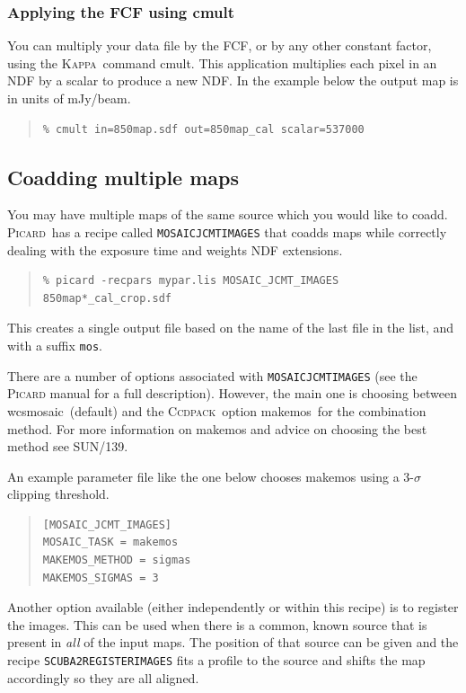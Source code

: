 \documentclass[twoside,11pt]{article}
\newcommand{\xref}[3]{#1}
\newcommand{\xlabel}[1]{}
\renewcommand{\_}{\texttt{\symbol{95}}}
\newenvironment{myquote}{\begin{quote}\begin{small}}{\end{small}\end{quote}}
\newcommand{\ccdpack}{\xref{\textsc{Ccdpack}}{sun139}{}}
\newcommand{\Kappa}{\xref{\textsc{Kappa}}{sun95}{}}
\newcommand{\picard}{\xref{\textsc{Picard}}{sun265}{}}
\newcommand{\drrecipe}[1]{\texttt{#1}}
\newcommand{\task}[1]{\textsf{#1}}
\newcommand{\param}[1]{\texttt{#1}}
\newcommand{\cmult}{\xref{\task{cmult}}{sun95}{CMULT}}
\newcommand{\wcsmosaic}{\xref{\task{wcsmosaic}}{sun95}{WCSMOSAIC}}
\newcommand{\makemos}{\xref{\task{makemos}}{sun139}{MAKEMOS}}
\begin{document}
\subsubsection{Applying the FCF using \cmult}

You can multiply your data file by the FCF, or by any other constant
factor, using the \Kappa\ command \cmult. This application multiplies
each pixel in an NDF by a scalar to produce a new NDF. In the example
below the output map is in units of mJy/beam.

\begin{myquote}
\begin{verbatim}
% cmult in=850map.sdf out=850map_cal scalar=537000
\end{verbatim}
\end{myquote}


\subsection{\xlabel{coadd}Coadding multiple maps}
\label{sec:coadd}

You may have multiple maps of the same source which you would like to
coadd. \picard\ has a recipe called
\xref{\drrecipe{MOSAIC\_JCMT\_IMAGES}}{sun265}{MOSAIC_JCMT_IMAGES}
that coadds maps while correctly dealing with the exposure time and
weights NDF extensions.
\begin{myquote}
\begin{verbatim}
% picard -recpars mypar.lis MOSAIC_JCMT_IMAGES 850map*_cal_crop.sdf
\end{verbatim}
\end{myquote}
This creates a single output file based on the name of the last file
in the list, and with a suffix \texttt{\_mos}.

There are a number of options associated with
\param{MOSAIC\_JCMT\_IMAGES} (see the \textsc{Picard} manual for a full
description). However, the main one is choosing between \wcsmosaic\
(default) and the \ccdpack\ option \makemos\ for the combination
method. For more information on \task{makemos} and advice on choosing the
best method see \xref{SUN/139}{sun139}{}.

An example parameter file like the one below chooses \task{makemos}
using a 3-$\sigma$ clipping threshold.
\begin{myquote}
\begin{verbatim}
[MOSAIC_JCMT_IMAGES]
MOSAIC_TASK = makemos
MAKEMOS_METHOD = sigmas
MAKEMOS_SIGMAS = 3
\end{verbatim}
\end{myquote}
Another option available (either independently or within this recipe)
is to register the images. This can be used when there is a common,
known source that is present in \emph{all} of the input maps. The
position of that source can be given and the recipe
\xref{\drrecipe{SCUBA2\_REGISTER\_IMAGES}}{sun265}{SCUBA2_REGISTER_IMAGES}
fits a profile to the source and shifts the map accordingly so they
are all aligned.
\end{document}
